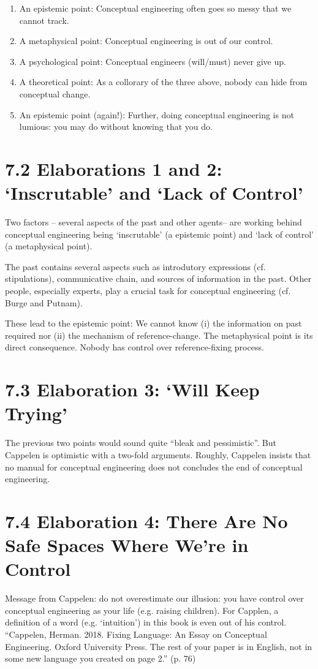 \documentclass[
10pt, %
a4paper, %
twocolumn, %
landscape %
]{article}
\begin{document}
\begin{enumerate}
  \item An epistemic point: Conceptual engineering often goes so messy that we cannot track.
  \item A metaphysical point: Conceptual engineering is out of our control.
  \item A psychological point: Conceptual engineers (will/must) never give up.
  \item A theoretical point: As a collorary of the three above, nobody can hide from conceptual change.
  \item An epistemic point (again!): Further, doing conceptual engineering is not lumious: you may do without knowing that you do.
\end{enumerate}

\section*{7.2 Elaborations 1 and 2: `Inscrutable' and `Lack of Control'}

Two factors -- several aspects of the past and other agents-- are working behind conceptual engineering being `inscrutable' (a epistemic point) and `lack of control' (a metaphysical point).

The past contains several aspects such as introdutory expressions (cf. stipulations), communicative chain, and sources of information in the past.
Other people, especially experts, play a crucial task for conceptual engineering (cf. Burge and Putnam).

These lead to the epistemic point: We cannot know (i) the information on past required nor (ii) the mechanism of reference-change.
The metaphysical point is its direct consequence. Nobody has control over reference-fixing process.



\section*{7.3 Elaboration 3: `Will Keep Trying'}
The previous two points would sound quite ``bleak and pessimistic''. But Cappelen is optimistic with a two-fold arguments.
Roughly, Cappelen insists that no manual for conceptual engineering does not concludes the end of conceptual engineering.

\section*{7.4 Elaboration 4: There Are No Safe Spaces Where We're in Control}
Message from Cappelen: do not overestimate our illusion: you have control over conceptual engineering as your life  (e.g. raising children).
For Capplen, a definition of a word (e.g. `intuition') in this book is even out of his control.
``Cappelen, Herman. 2018. Fixing Language: An Essay on Conceptual Engineering. Oxford University Press. The rest of your paper is in English, not in some new language you created on page 2.'' (p. 76)
\end{document}

